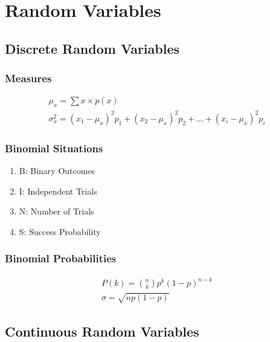 \documentclass[12pt]{article}
\numberwithin{equation}{section}
\begin{document}
\section{Random Variables}

\subsection{Discrete Random Variables}
\subsubsection{Measures}
\begin{gather}
    \mu_x = \sum x \times p(x) \\
    \sigma^2_x = (x_1-\mu_x)^2 p_1 + (x_2-\mu_x)^2 p_2 + ... + (x_i-\mu_x)^2 p_i
\end{gather}

\subsubsection{Binomial Situations}
\begin{enumerate}
    \item B: Binary Outcomes
    \item I: Independent Trials
    \item N: Number of Trials
    \item S: Success Probability
\end{enumerate}
\subsubsection{Binomial Probabilities}
\begin{gather}
    P(k)=\binom{n}{k} p^k (1-p)^{n-k} \\
    \sigma = \sqrt{np(1-p)}
\end{gather}

\subsection{Continuous Random Variables}
\end{document}
